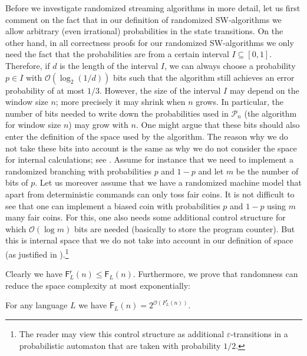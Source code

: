\documentclass{article}\usepackage[a4paper,margin=20mm]{geometry}
\renewcommand{\O}{\mathcal{O}}
\renewcommand{\P}{\mathcal{P}}
\newcommand{\F}{\mathsf{F}}
\renewcommand{\r}{\mathsf{r}}
\renewcommand{\leq}{\leqslant}
\renewcommand{\le}{\leq}
\begin{document}
Before we investigate randomized streaming algorithms in more detail, let us first comment on the fact that in our 
definition of randomized SW-algorithms we allow arbitrary (even irrational) probabilities in the state transitions.
On the other hand, in all correctness proofs for our randomized SW-algorithms we only need the fact that
the probabilities are from a certain  interval $I \subseteq [0,1]$. Therefore, if $d$ is the length of the interval $I$, we can always choose a probability $p \in I$ with $\O(\log_2(1/d))$ bits such that the algorithm still achieves an error probability of at most $1/3$.
However, the size of the interval $I$ may depend on the window size $n$; more precisely it may shrink when $n$ grows.
In particular, the number of bits needed to write down the probabilities used in $\P_n$ (the algorithm for window size $n$)
may grow with $n$. One might argue that these bits should also enter the definition of the space used by the algorithm.
The reason why we do not take these bits into account is the same as why we do not consider the space  
 for internal calculations; see .
 Assume for instance that we need to implement a randomized branching with probabilities $p$ and $1-p$ and 
 let $m$ be the number of bits of $p$. Let us moreover assume that we have a randomized machine model that
 apart from deterministic commands can only toss fair coins.
  It is not difficult to see that one can implement a biased coin with probabilities $p$ and $1-p$ using 
  $m$ many fair coins. For this, one also needs some additional
 control structure for which $\O(\log m)$ bits are needed (basically to store the program counter). But this is internal space that we do not take into account in our definition of space (as justified in ).\footnote{The reader may
 view this control structure as additional $\varepsilon$-transitions in a probabilistic automaton that are taken with probability
 $1/2$.}


Clearly we have $\F^\r_L(n) \le \F_L(n)$.
Furthermore, we prove that randomness can reduce
the space complexity at most exponentially:

\begin{lemma}
\label{lem:rabin}
For any language $L$ we have $\F_L(n) = 2^{\O(F^\r_L(n))}$.
\end{lemma}
\end{document}
